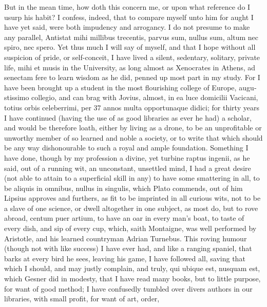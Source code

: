 {But in the mean time, how doth this concern me, or upon what reference
do I usurp his habit? I confess, indeed, that to compare myself unto
him for aught I have yet said, were both impudency and arrogancy. I do
not presume to make any parallel, \textlatin{Antistat mihi millibus trecentis, parvus sum, nullus sum, altum nec spiro, nec spero.} Yet thus much I
will say of myself, and that I hope without all suspicion of pride, or
self-conceit, I have lived a silent, sedentary, solitary, private life,
mihi et musis in the University, as long almost as Xenocrates in
Athens, ad senectam fere to learn wisdom as he did, penned up most part
in my study. For I have been brought up a student in the most
flourishing college of Europe,  \textlatin{augustissimo collegio}, and can brag
with Jovius, almost, \textlatin{in ea luce domicilii Vacicani, totius orbis celeberrimi, per 37 annos multa opportunaque didici}; for thirty years I
have continued (having the use of as good libraries as ever he had)
a scholar, and would be therefore loath, either by living as a drone,
to be an unprofitable or unworthy member of so learned and noble a
society, or to write that which should be any way dishonourable to such
a royal and ample foundation. Something I have done, though by my
profession a divine, yet turbine raptus ingenii, as he said, out of
a running wit, an unconstant, unsettled mind, I had a great desire (not
able to attain to a superficial skill in any) to have some smattering
in all, to be aliquis in omnibus, nullus in singulis,  which
Plato commends, out of him Lipsius approves and furthers, as
fit to be imprinted in all curious wits, not to be a slave of one
science, or dwell altogether in one subject, as most do, but to rove
abroad, centum puer artium, to have an oar in every man's boat, to 
taste of every dish, and sip of every cup, which, saith Montaigne,
was well performed by Aristotle, and his learned countryman Adrian
Turnebus. This roving humour (though not with like success) I have ever
had, and like a ranging spaniel, that barks at every bird he sees,
leaving his game, I have followed all, saving that which I should, and
may justly complain, and truly, qui ubique est, nusquam est, which
Gesner did in modesty, that I have read many books, but to little
purpose, for want of good method; I have confusedly tumbled over divers
authors in our libraries, with small profit, for want of art, order,
}
